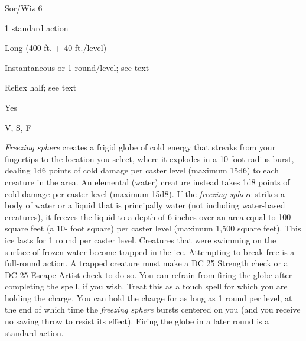 
\begin{description*}
\item[Level:] Sor/Wiz 6
\item[Casting Time:] 1 standard action
\item[Range:] Long (400 ft. + 40 ft./level)
\item[Duration:] Instantaneous or 1 round/level; see text
\item[Saving Throw:] Reflex half; see text
\item[Spell Resistance:] Yes
\item[Components:] V, S, F
\end{description*}

\textit{Freezing sphere} creates a frigid globe of cold energy that streaks from
your fingertips to the location you select, where it explodes in a 10-foot-radius
burst, dealing 1d6 points of cold damage per caster level (maximum 15d6) to each
creature in the area. An elemental (water) creature instead takes 1d8 points of
cold damage per caster level (maximum 15d8).
If the \textit{freezing sphere} strikes a body of water or a liquid that is principally
water (not including water-based creatures), it freezes the liquid to a depth of
6 inches over an area equal to 100 square feet (a 10- foot square) per caster level
(maximum 1,500 square feet). This ice lasts for 1 round per caster level. Creatures
that were swimming on the surface of frozen water become trapped in the ice. Attempting
to break free is a full-round action. A trapped creature must make a DC 25 Strength
check or a DC 25 Escape Artist check to do so.
You can refrain from firing the globe after completing the spell, if you wish.
Treat this as a touch spell for which you are holding the charge. You can hold
the charge for as long as 1 round per level, at the end of which time the \textit{freezing
sphere} bursts centered on you (and you receive no saving throw to resist its effect).
Firing the globe in a later round is a standard action.